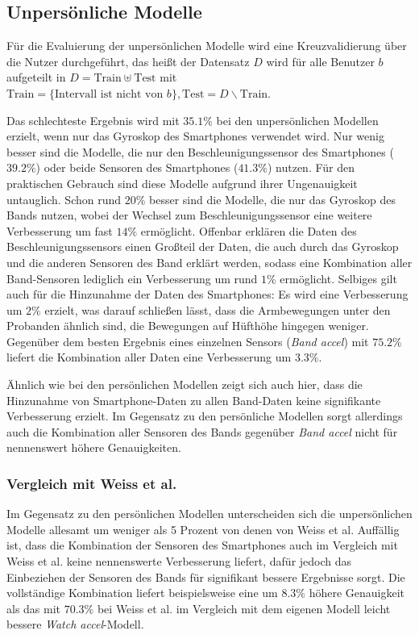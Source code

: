 \subsection{Unpersönliche Modelle}
\label{subsec:eval-impersonal-models}
Für die Evaluierung der unpersönlichen Modelle wird eine Kreuzvalidierung über die Nutzer durchgeführt, das heißt der Datensatz $D$ wird für alle Benutzer $b$ aufgeteilt in $D = \text{Train} \uplus \text{Test}$ mit $\text{Train} = \{\text{Intervall ist nicht von } b\}, \text{Test} = D \backslash \text{Train}$.

Das schlechteste Ergebnis wird mit $35.1 \%$ bei den unpersönlichen Modellen erzielt, wenn nur das Gyroskop des Smartphones verwendet wird. Nur wenig besser sind die Modelle, die nur den Beschleunigungssensor des Smartphones ($39.2 \%$) oder beide Sensoren des Smartphones ($41.3 \%$) nutzen. Für den praktischen Gebrauch sind diese Modelle aufgrund ihrer Ungenauigkeit untauglich. Schon rund $20 \%$ besser sind die Modelle, die nur das Gyroskop des Bands nutzen, wobei der Wechsel zum Beschleunigungssensor eine weitere Verbesserung um fast $14 \%$ ermöglicht. Offenbar erklären die Daten des Beschleunigungssensors einen Großteil der Daten, die auch durch das Gyroskop und die anderen Sensoren des Band erklärt werden, sodass eine Kombination aller Band-Sensoren lediglich ein Verbesserung um rund $1 \%$ ermöglicht. Selbiges gilt auch für die Hinzunahme der Daten des Smartphones: Es wird eine Verbesserung um $2 \%$ erzielt, was darauf schließen lässt, dass die Armbewegungen unter den Probanden ähnlich sind, die Bewegungen auf Hüfthöhe hingegen weniger. Gegenüber dem besten Ergebnis eines einzelnen Sensors (\textit{Band accel}) mit $75.2 \%$ liefert die Kombination aller Daten eine Verbesserung um $3.3 \%$.

Ähnlich wie bei den persönlichen Modellen zeigt sich auch hier, dass die Hinzunahme von Smartphone-Daten zu allen Band-Daten keine signifikante Verbesserung erzielt. Im Gegensatz zu den persönliche Modellen sorgt allerdings auch die Kombination aller Sensoren des Bands gegenüber \textit{Band accel} nicht für nennenswert höhere Genauigkeiten.

\subsubsection{Vergleich mit Weiss et al.}
Im Gegensatz zu den persönlichen Modellen unterscheiden sich die unpersönlichen Modelle allesamt um weniger als 5 Prozent von denen von Weiss et al. Auffällig ist, dass die Kombination der Sensoren des Smartphones auch im Vergleich mit Weiss et al. keine nennenswerte Verbesserung liefert, dafür jedoch das Einbeziehen der Sensoren des Bands für signifikant bessere Ergebnisse sorgt. Die vollständige Kombination liefert beispielsweise eine um $8.3 \%$ höhere Genauigkeit als das mit $70.3 \%$ bei Weiss et al. im Vergleich mit dem eigenen Modell leicht bessere \textit{Watch accel}-Modell.

